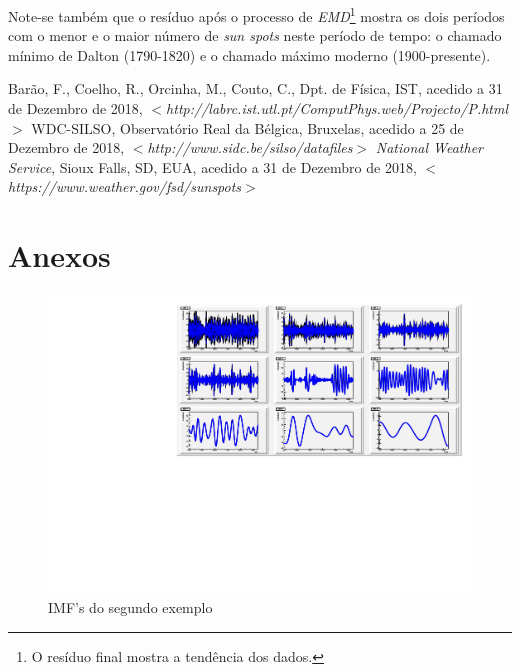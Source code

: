 \documentclass[letterpaper]{article}
\begin{document}
\begin{multicols}{2}
\par Note-se também que o resíduo após o processo de \textit{EMD}\footnote{O resíduo final mostra a tendência dos dados.} mostra os dois períodos com o menor e o maior número de \textit{sun spots} neste período de tempo: o chamado mínimo de Dalton (1790-1820) e o chamado máximo moderno (1900-presente).

\begin{thebibliography}{9}
 Barão, F., Coelho, R., Orcinha, M., Couto, C., Dpt. de Física, IST,
 acedido a 31 de Dezembro de 2018, $<$\textit{http://labrc.ist.utl.pt/ComputPhys.web/Projecto/P.html}$>$
 WDC-SILSO, Observatório Real da Bélgica, Bruxelas,
 acedido a 25 de Dezembro de 2018, 
 $<$\textit{http://www.sidc.be/silso/datafiles}$>$
 \textit{National Weather Service}, Sioux Falls, SD, EUA,
 acedido a 31 de Dezembro de 2018, 
 $<$\textit{https://www.weather.gov/fsd/sunspots}$>$
\end{thebibliography}

\end{multicols}

\section{Anexos}

\begin{center}
\begin{figure}[H]
\centering
    \includegraphics[width=\columnwidth]{IMFs_Sun.pdf}
    \caption{IMF's do segundo exemplo}
\end{figure}
\end{center}
\end{document}
